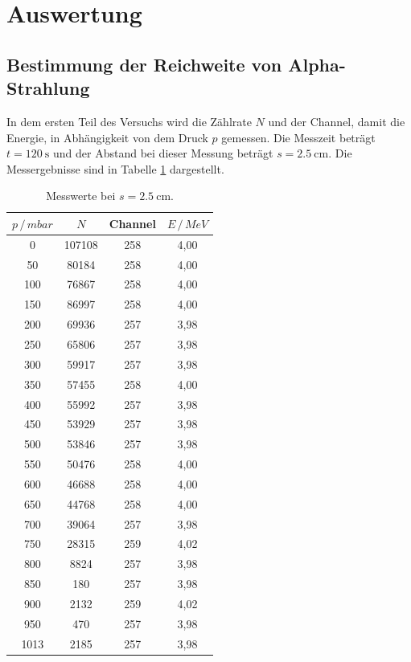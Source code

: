 \section{Auswertung}

\subsection{Bestimmung der Reichweite von Alpha-Strahlung}

In dem ersten Teil des Versuchs wird die Zählrate $N$ und der Channel, damit die
Energie, in Abhängigkeit von dem Druck $p$ gemessen. Die Messzeit beträgt $t = \SI{120}{\second}$
und der Abstand bei dieser Messung beträgt $s = \SI{2.5}{\centi\meter}$. Die Messergebnisse
sind in Tabelle \ref{tab:1} dargestellt.

\begin{table}[H]
  \centering
  \caption{Messwerte bei $s =  \SI{2.5}{\centi\meter}$.}
  \label{tab:1}
  \begin{tabular}{c c c c}
    \toprule
    $p \, / \, mbar$ & $N$ & Channel & $E \, / \, MeV$ \\
    \midrule
    0 & 107108 &  258 & 4,00 \\
   50 &  80184 &  258 & 4,00 \\
  100 &  76867 &  258 & 4,00 \\
  150 &  86997 &  258 & 4,00 \\
  200 &  69936 &  257 & 3,98 \\
  250 &  65806 &  257 & 3,98 \\
  300 &  59917 &  257 & 3,98 \\
  350 &  57455 &  258 & 4,00 \\
  400 &  55992 &  257 & 3,98 \\
  450 &  53929 &  257 & 3,98 \\
  500 &  53846 &  257 & 3,98 \\
  550 &  50476 &  258 & 4,00 \\
  600 &  46688 &  258 & 4,00 \\
  650 &  44768 &  258 & 4,00 \\
  700 &  39064 &  257 & 3,98 \\
  750 &  28315 &  259 & 4,02 \\
  800 &   8824 &  257 & 3,98 \\
  850 &    180 &  257 & 3,98 \\
  900 &   2132 &  259 & 4,02 \\
  950 &    470 &  257 & 3,98 \\
 1013 &   2185 &  257 & 3,98 \\
    \bottomrule
  \end{tabular}
\end{table}

